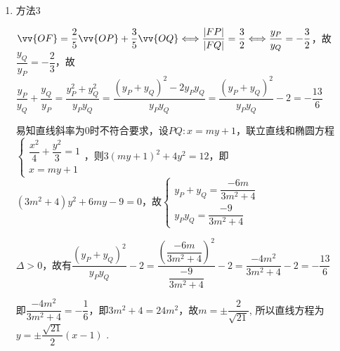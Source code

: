 \begin{enumerate}
\begin{enumerate}
\begin{jieda}
\begin{enumerate}
                故$k = \pm \dfrac{\sqrt{21}}{2}$,所以直线方程为 $y =  \pm  \dfrac{\sqrt{21}}{2}\left( {x - 1}\right)$ .
    
                \item 方法3
                
                $\vv{OF} = \dfrac{2}{5}\vv{OP} + \dfrac{3}{5}\vv{OQ} \Longleftrightarrow \dfrac{|FP|}{|FQ|} = \dfrac{3}{2} \Longleftrightarrow \dfrac{y_P}{y_Q} = -\dfrac{3}{2}$，故$\dfrac{y_Q}{y_P} = -\dfrac{2}{3}$，故$\dfrac{y_P}{y_Q} + \dfrac{y_Q}{y_P} = \dfrac{y_P^2+y_Q^2}{y_Py_Q} = \dfrac{(y_P+y_Q)^2-2y_Py_Q}{y_Py_Q} = \dfrac{(y_P+y_Q)^2}{y_Py_Q} - 2 = -\dfrac{13}{6}$
    
                易知直线斜率为0时不符合要求，设$PQ: x = my + 1$，联立直线和椭圆方程$\left\{\begin{array}{l}
                     \dfrac{{x}^{2}}{4} + \dfrac{{y}^{2}}{3} = 1  \\
                     x = my + 1
                \end{array}\right.$，则$3(my + 1)^2 + 4y^2 = 12$，即$(3m^2+4)y^2+6my-9=0$，故$\left\{\begin{array}{l}
                     y_P+y_Q = \dfrac{-6m}{3m^2+4} \\
                     y_Py_Q = \dfrac{-9}{3m^2+4}
                \end{array}\right.$
    
                $\Delta > 0$，故有$\dfrac{(y_P+y_Q)^2}{y_Py_Q} - 2 = \dfrac{\left(\dfrac{-6m}{3m^2+4}\right)^2}{\dfrac{-9}{3m^2+4}} - 2 = \dfrac{-4m^2}{3m^2+4} - 2 = -\dfrac{13}{6}$
    
                即$\dfrac{-4m^2}{3m^2+4} = -\dfrac{1}{6}$，即$3m^2+4 = 24m^2$，故$m = \pm \dfrac{2}{\sqrt{21}}$, 所以直线方程为 $y =  \pm  \dfrac{\sqrt{21}}{2}\left( {x - 1}\right)$ .
            \end{enumerate}
        \end{jieda}
    

\end{enumerate}
\end{enumerate}
